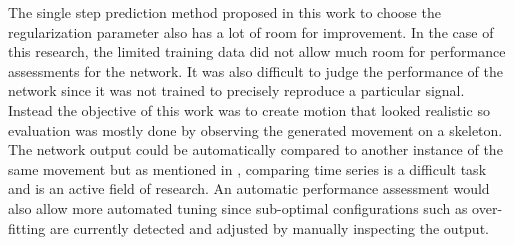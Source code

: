 \documentclass[letterpaper,9pt]{article}
\begin{document}
The single step prediction method proposed in this work to choose the regularization parameter also has a lot of room for improvement. In the case of this research, the limited training data did not allow much room for performance assessments for the network. It was also difficult to judge the performance of the network since it was not trained to precisely reproduce a particular signal. Instead the objective of this work was to create motion that looked realistic so evaluation was mostly done by observing the generated movement on a skeleton. The network output could be automatically compared to another instance of the same movement but as mentioned in \cite{SimilarityMeasure}, comparing time series is a difficult task and is an active field of research. An automatic performance assessment would also allow more automated tuning since sub-optimal configurations such as over-fitting are currently detected and adjusted by manually inspecting the output.



\end{document}
